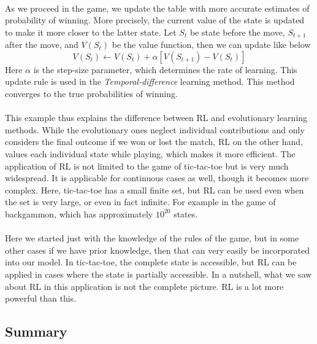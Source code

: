 \documentclass{article}
\begin{document}
    \paragraph{}As we proceed in the game, we update the table with more accurate estimates of probability of winning. More precisely, the current value of the state is updated to make it more closer to the latter state. Let $S_t$ be state before the move, $S_{t+1}$ after the move, and $V(S_t)$ be the value function, then we can update like below
    \begin{equation*}
      V(S_t) \leftarrow V(S_t) + \alpha \left[ V(S_{t+1}) - V(S_t) \right]
    \end{equation*}
    Here $\alpha$ is the step-size parameter, which determines the rate of learning. This update rule is used in the \textit{Temporal-difference} learning method. This method converges to the true probabilities of winning.
    \paragraph{}This example thus explains the difference between RL and evolutionary learning methods. While the evolutionary ones neglect individual contributions and only considers the final outcome if we won or lost the match, RL on the other hand, values each individual state while playing, which makes it more efficient. The application of RL is not limited to the game of tic-tac-toe but is very much widespread. It is applicable for continuous cases as well, though it becomes more complex. Here, tic-tac-toe has a small finite set, but RL can be used even when the set is very large, or even in fact infinite. For example in the game of backgammon, which has approximately $10^{20}$ states.
    \paragraph{}Here we started just with the knowledge of the rules of the game, but in some other cases if we have prior knowledge, then that can very easily be incorporated into our model. In tic-tac-toe, the complete state is accessible, but RL can be applied in cases where the state is partially accessible. In a nutshell, what we saw about RL in this application is not the complete picture. RL is a lot more powerful than this.
  

  \subsection{Summary}
\end{document}
